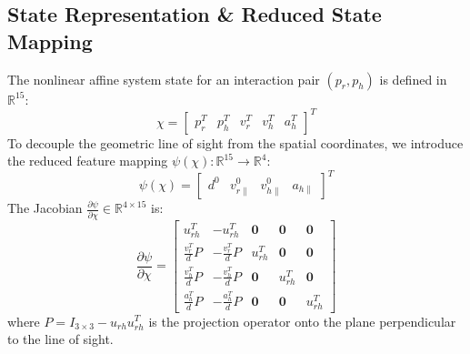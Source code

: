 \documentclass[10pt,twocolumn,a4paper]{article}
\begin{document}
\subsection{State Representation \& Reduced State Mapping}
The nonlinear affine system state for an interaction pair $(p_r, p_h)$ is defined in $\mathbb{R}^{15}$:
\begin{equation}
\chi = \begin{bmatrix} p_r^T & p_h^T & v_r^T & v_h^T & a_h^T \end{bmatrix}^T
\end{equation}
To decouple the geometric line of sight from the spatial coordinates, we introduce the reduced feature mapping $\psi(\chi) : \mathbb{R}^{15} \to \mathbb{R}^4$:
\begin{equation}
\psi(\chi) = \begin{bmatrix} d^0 & v_{r\parallel}^0 & v_{h\parallel}^0 & a_{h\parallel} \end{bmatrix}^T
\end{equation}
The Jacobian $\frac{\partial \psi}{\partial \chi} \in \mathbb{R}^{4 \times 15}$ is:
\begin{equation}
\frac{\partial \psi}{\partial \chi} = \begin{bmatrix}
u_{rh}^T & -u_{rh}^T & \mathbf{0} & \mathbf{0} & \mathbf{0} \\
\frac{v_r^T}{d} P & -\frac{v_r^T}{d} P & u_{rh}^T & \mathbf{0} & \mathbf{0} \\
\frac{v_h^T}{d} P & -\frac{v_h^T}{d} P & \mathbf{0} & u_{rh}^T & \mathbf{0} \\
\frac{a_h^T}{d} P & -\frac{a_h^T}{d} P & \mathbf{0} & \mathbf{0} & u_{rh}^T
\end{bmatrix}
\end{equation}
where $P = I_{3 \times 3} - u_{rh} u_{rh}^T$ is the projection operator onto the plane perpendicular to the line of sight.
\end{document}
